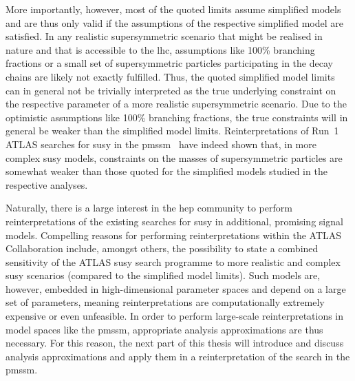More importantly, however, most of the quoted limits assume simplified models and are thus only valid if the assumptions of the respective simplified model are satisfied. 
In any realistic supersymmetric scenario that might be realised in nature and that is accessible to the \gls{lhc}, assumptions like 100\% branching fractions or a small set of supersymmetric particles participating in the decay chains are likely not exactly fulfilled. 
Thus, the quoted simplified model limits can in general not be trivially interpreted as the true underlying constraint on the respective parameter of a more realistic supersymmetric scenario. 
Due to the optimistic assumptions like 100\% branching fractions, the true constraints will in general be weaker than the simplified model limits.
Reinterpretations of Run~1 ATLAS searches for \gls{susy} in the \gls{pmssm}~\cite{pMSSM-scan-run1:2015baa} have indeed shown that, in more complex \gls{susy} models, constraints on the masses of supersymmetric particles are somewhat weaker than those quoted for the simplified models studied in the respective analyses.

Naturally, there is a large interest in the \gls{hep} community to perform reinterpretations of the existing searches for \gls{susy} in additional, promising signal models. 
Compelling reasons for performing reinterpretations within the ATLAS Collaboration include, amongst others, the possibility to state a combined sensitivity of the ATLAS \gls{susy} search programme to more realistic and complex \gls{susy} scenarios (compared to the simplified model limits).
Such models are, however, embedded in high-dimensional parameter spaces and depend on a large set of parameters, meaning reinterpretations are computationally extremely expensive or even unfeasible. In order to perform large-scale reinterpretations in model spaces like the \gls{pmssm}, appropriate analysis approximations are thus necessary. For this reason, the next part of this thesis will introduce and discuss analysis approximations and apply them in a reinterpretation of the \onelepton search in the \gls{pmssm}.


